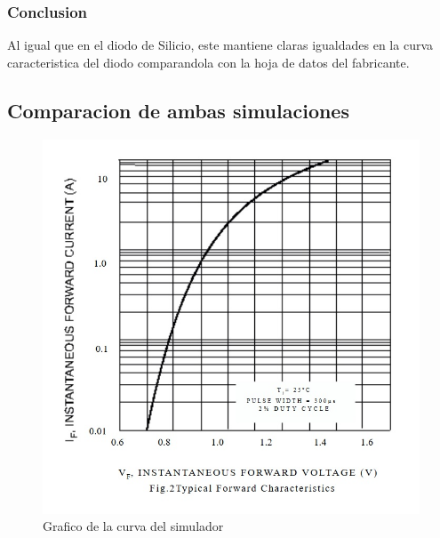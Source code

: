 \documentclass[chaptersright]{informeutn}
\begin{document}
                \subsubsection{Conclusion}
                    Al igual que en el diodo de Silicio, este mantiene claras igualdades en la curva caracteristica del diodo comparandola con la hoja de datos del fabricante.
                    \newpage


                \subsection{Comparacion de ambas simulaciones}
                
                \begin{figure}[!h]
                    \centering
                    \begin{minipage}[b]{0.4\textwidth}
                        \includegraphics[width=1.1\linewidth]{pictures/Curva_Datash_Si.jpg}
                        \caption{Grafico de la curva del simulador}
                    \end{minipage}
                \end{figure}
\end{document}
